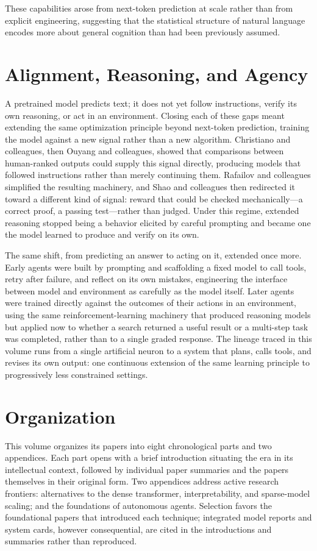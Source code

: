 These capabilities arose from next-token prediction at scale rather than from explicit engineering, suggesting that the statistical structure of natural language encodes more about general cognition than had been previously assumed.

\section*{Alignment, Reasoning, and Agency}

A pretrained model predicts text; it does not yet follow instructions, verify its own reasoning, or act in an environment. Closing each of these gaps meant extending the same optimization principle beyond next-token prediction, training the model against a new signal rather than a new algorithm. Christiano and colleagues, then Ouyang and colleagues, showed that comparisons between human-ranked outputs could supply this signal directly, producing models that followed instructions rather than merely continuing them. Rafailov and colleagues simplified the resulting machinery, and Shao and colleagues then redirected it toward a different kind of signal: reward that could be checked mechanically---a correct proof, a passing test---rather than judged. Under this regime, extended reasoning stopped being a behavior elicited by careful prompting and became one the model learned to produce and verify on its own.

The same shift, from predicting an answer to acting on it, extended once more. Early agents were built by prompting and scaffolding a fixed model to call tools, retry after failure, and reflect on its own mistakes, engineering the interface between model and environment as carefully as the model itself. Later agents were trained directly against the outcomes of their actions in an environment, using the same reinforcement-learning machinery that produced reasoning models but applied now to whether a search returned a useful result or a multi-step task was completed, rather than to a single graded response. The lineage traced in this volume runs from a single artificial neuron to a system that plans, calls tools, and revises its own output: one continuous extension of the same learning principle to progressively less constrained settings.

\section*{Organization}

This volume organizes its papers into eight chronological parts and two appendices. Each part opens with a brief introduction situating the era in its intellectual context, followed by individual paper summaries and the papers themselves in their original form. Two appendices address active research frontiers: alternatives to the dense transformer, interpretability, and sparse-model scaling; and the foundations of autonomous agents. Selection favors the foundational papers that introduced each technique; integrated model reports and system cards, however consequential, are cited in the introductions and summaries rather than reproduced.

